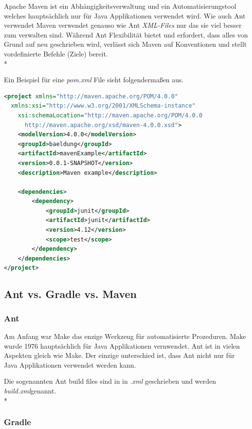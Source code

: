 Apache Maven ist ein Abhängigkeitsverwaltung und ein Automatisierungstool welches hauptsächlich nur für Java Applikationen verwendet wird. Wie auch Ant verwendet
Maven verwendet genauso wie Ant \textit{XML-Files} nur das sie viel besser zum verwalten sind. Während Ant Flexibilität bietet und erfordert, 
dass alles von Grund auf neu geschrieben wird, verlässt sich Maven auf Konventionen und stellt vordefinierte Befehle (Ziele) bereit. \\* \cite{MavenVsAntVsGradle}

Ein Beispiel für eine \textit{pom.xml} File sieht folgendermaßen aus.

 
\begin{lstlisting}[language=xml,caption=maven file,label=lst:impl:foo]
<project xmlns="http://maven.apache.org/POM/4.0.0" 
  xmlns:xsi="http://www.w3.org/2001/XMLSchema-instance"
    xsi:schemaLocation="http://maven.apache.org/POM/4.0.0 
      http://maven.apache.org/xsd/maven-4.0.0.xsd">
    <modelVersion>4.0.0</modelVersion>
    <groupId>baeldung</groupId>
    <artifactId>mavenExample</artifactId>
    <version>0.0.1-SNAPSHOT</version>
    <description>Maven example</description>

    <dependencies>
        <dependency>
            <groupId>junit</groupId>
            <artifactId>junit</artifactId>
            <version>4.12</version>
            <scope>test</scope>
        </dependency>
    </dependencies>
</project>
\end{lstlisting}

\subsection{Ant vs. Gradle vs. Maven}

\subsubsection{Ant}

Am Anfang war Make das enzige Werkzeug für automatisierte Prozeduren. Make wurde 1976 hauptsächlich für Java Applikationen vernwendet.
Ant ist in vielen Aspekten gleich wie Make. Der einzige unterschied ist, dass Ant nicht nur für Java Applikationen verwendet werden kann.

Die sogenannten Ant build files sind in in \textit{.xml} geschrieben und werden \textit{build.xml}genannt. \\* \cite{MavenVsAntVsGradle}

\subsubsection{Gradle}

